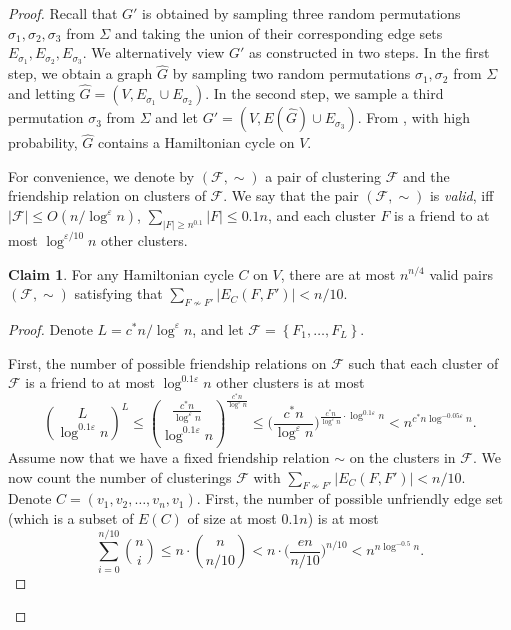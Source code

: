 \documentclass[11pt]{article}
\theoremstyle{definition}
\newtheorem{claim}[theorem]{Claim}
\newcommand{\set}[1]{\left\{ #1 \right\}}
\newcommand{\fset}{{\mathcal{F}}}
\newcommand{\eps}{{\varepsilon}}
\newcounter{note}
\begin{document}
\begin{proof}
Recall that $G'$ is obtained by sampling three random permutations $\sigma_1,\sigma_2,\sigma_3$ from $\Sigma$ and taking the union of their corresponding edge sets $E_{\sigma_1}, E_{\sigma_2}, E_{\sigma_3}$. We alternatively view $G'$ as constructed in two steps. In the first step, we obtain a graph $\hat G$ by sampling two random permutations $\sigma_1,\sigma_2$ from $\Sigma$ and letting $\hat G=(V,E_{\sigma_1}\cup E_{\sigma_2})$. In the second step, we sample a third permutation $\sigma_3$ from $\Sigma$ and let $G'=(V, E(\hat G)\cup E_{\sigma_3})$.
From , with high probability, $\hat G$ contains a Hamiltonian cycle on $V$.

    For convenience, we denote by $(\fset,\sim)$ a pair of clustering $\fset$ and the friendship relation on clusters of $\fset$. We say that the pair $(\fset,\sim)$ is \emph{valid}, iff $|\fset|\le O(n/\log^{\eps} n)$, $\sum_{|F|\ge n^{0.1}}|F|\le 0.1n$, and each cluster $F$ is a friend to at most $\log^{\eps/10} n$ other clusters.

\begin{claim}
\label{clm: number of partition}
For any Hamiltonian cycle $C$ on $V$, there are at most $n^{n/4}$ valid pairs $(\fset,\sim)$ satisfying that $\sum_{F\not\sim F'}|E_{C}(F,F')| < n/10$.
\end{claim}
\begin{proof}
Denote $L=c^*n/\log^{\eps} n$,
and let $\fset=\set{F_1,\ldots,F_L}$.

First, the number of possible friendship relations on $\fset$ such that each cluster of $\fset$ is a friend to at most $\log^{0.1\eps} n$ other clusters is at most 
$$
\binom{L}{\log^{0.1\eps} n}^L\le 
\binom{\frac{c^*n}{\log^{\eps} n}}{\log^{0.1\eps} n} ^{\frac{c^*n}{\log^{\eps} n}} \le \bigg(\frac{c^*n}{\log^{\eps} n}\bigg)^{\frac{c^*n}{\log^{\eps} n}\cdot \log^{0.1\eps} n}<  n^{c^*n \log^{-0.05\eps} n}.
$$
Assume now that we have a fixed friendship relation $\sim$ on the clusters in $\fset$. We now count the number of clusterings $\fset$ with $\sum_{F\not\sim F'}|E_{C}(F,F')| < n/10$.
Denote $C=(v_1, v_2, \ldots, v_n,v_1)$. 
First, the number of possible unfriendly edge set (which is a subset of $E(C)$ of size at most $0.1n$) is at most
$$\sum_{i=0}^{n/10} \binom{n}{i} \le n \cdot \binom{n}{n/10} < n\cdot \bigg(\frac{en}{n/10}\bigg)^{n/10} < n^{n \log^{-0.5}n}.$$


\end{proof}
\end{proof}
\end{document}
